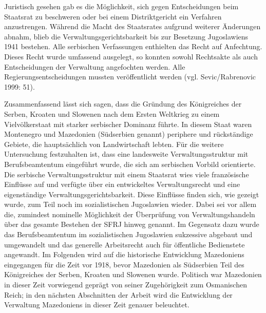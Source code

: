 Juristisch gesehen gab es die Möglichkeit, sich gegen Entscheidungen beim Staatsrat zu beschweren oder bei einem Distriktgericht ein Verfahren anzustrengen. Während die Macht des Staatsrates aufgrund weiterer Änderungen abnahm, blieb die Verwaltungsgerichtsbarkeit bis zur Besetzung Jugoslawiens 1941 bestehen. Alle serbischen Verfassungen enthielten das Recht auf Anfechtung. Dieses Recht wurde umfassend ausgelegt, so konnten sowohl Rechtsakte als auch Entscheidungen der Verwaltung angefochten werden. Alle Regierungsentscheidungen mussten veröffentlicht werden (vgl. Sevic/Rabrenovic 1999: 51).\par
Zusammenfassend lässt sich sagen, dass die Gründung des Königreiches der Serben, Kroaten und Slowenen nach dem Ersten Weltkrieg zu einem Vielvölkerstaat mit starker serbischer Dominanz führte. In diesem Staat waren Montenegro und Mazedonien (Südserbien genannt) periphere und rückständige Gebiete, die hauptsächlich von Landwirtschaft lebten. Für die weitere Untersuchung festzuhalten ist, dass eine landesweite Verwaltungsstruktur mit Berufsbeamtentum eingeführt wurde, die sich am serbischen Vorbild orientierte. Die serbische Verwaltungsstruktur mit einem Staatsrat wies viele französische Einflüsse auf und verfügte über ein entwickeltes Verwaltungsrecht und eine eigenständige Verwaltungsgerichtsbarkeit. Diese Einflüsse finden sich, wie gezeigt wurde, zum Teil noch im sozialistischen Jugoslawien wieder. Dabei sei vor allem die, zumindest nominelle Möglichkeit der Überprüfung von Verwaltungshandeln über das gesamte Bestehen der SFRJ hinweg genannt. Im Gegensatz dazu wurde das Berufsbeamtentum im sozialistischen Jugoslawien sukzessive abgebaut und umgewandelt und das generelle Arbeitsrecht auch für öffentliche Bedienstete angewandt.
Im Folgenden wird auf die historische Entwicklung Mazedoniens eingegangen für die Zeit vor 1918, bevor Mazedonien als Südserbien Teil des Königreiches der Serben, Kroaten und Slowenen wurde. Politisch war Mazedonien in dieser Zeit vorwiegend geprägt von seiner Zugehörigkeit zum Osmanischen Reich; in den nächsten Abschnitten der Arbeit wird die Entwicklung der Verwaltung Mazedoniens in dieser Zeit genauer beleuchtet.
